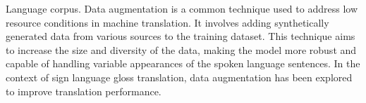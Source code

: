 Language corpus. Data augmentation is a common technique used to address low resource conditions in machine translation. It involves adding synthetically generated data from various sources to the training dataset. This technique aims to increase the size and diversity of the data, making the model more robust and capable of handling variable appearances of the spoken language sentences. In the context of sign language gloss translation, data augmentation \cite{data_augmenta} has been explored to improve translation performance. 